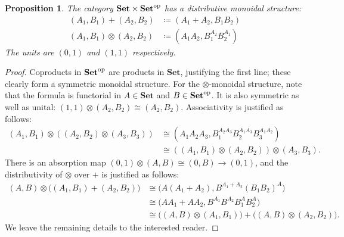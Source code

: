 \documentclass[11pt, one side, article]{memoir}
\theoremstyle{definition}
\theoremstyle{plain}
\newtheorem{proposition}[definitionx]{Proposition}
\newcommand{\Cat}[1]{\mathbf{#1}}%
\newcommand{\op}{^\tn{op}}
\newcommand{\tn}[1]{\textnormal{#1}}
\newcommand{\smset}{\Cat{Set}}
\newcommand{\0}{\textsf{0}}
\newcommand{\1}{\tn{\textsf{1}}}
\begin{document}
\begin{proposition}
The category $\smset\times\smset\op$ has a distributive monoidal structure:
\begin{align*}
  (A_1,B_1)+(A_2,B_2)&\coloneqq(A_1+A_2,B_1B_2)\\
  (A_1,B_1)\otimes(A_2,B_2)&\coloneqq(A_1A_2,B_1^{A_2}B_2^{A_1})
\end{align*}
The units are $(0,1)$ and $(1,1)$ respectively.
\end{proposition}
\begin{proof}
Coproducts in $\smset\op$ are products in $\smset$, justifying the first line; these clearly form a symmetric monoidal structure. For the $\otimes$-monoidal structure, note that the formula is functorial in $A\in\smset$ and $B\in\smset\op$. It is also symmetric as well as unital: $(1,1)\otimes(A_2,B_2)\cong(A_2,B_2)$. Associativity is justified as follows:
\begin{align*}
  (A_1,B_1)\otimes((A_2,B_2)\otimes(A_3,B_3))&\cong
	(A_1A_2A_3,B_1^{A_2A_3}B_2^{A_1A_3}B_3^{A_1A_2})\\&\cong
	((A_1,B_1)\otimes(A_2,B_2))\otimes(A_3,B_3).
\end{align*}
There is an absorption map $(0,1)\otimes (A,B)\cong(0,B)\to(0,1)$, and the distributivity of $\otimes$ over $+$ is justified as follows:
\begin{align*}
  (A,B)\otimes\big((A_1,B_1)+(A_2,B_2)\big)&\cong 
  \big(A(A_1+A_2),B^{A_1+A_2}(B_1B_2)^A\big)\\&\cong
  \big(AA_1+AA_2,B^{A_1}B^{A_2}B_1^AB_2^A\big)\\&\cong
  \big((A,B)\otimes(A_1,B_1))+((A,B)\otimes(A_2,B_2)\big).
\end{align*}
We leave the remaining details to the interested reader.
\end{proof}
\end{document}
